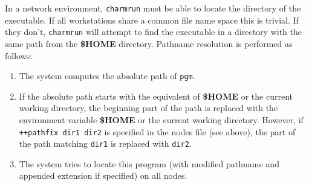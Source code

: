 In a network environment, {\tt charmrun} must
be able to locate the directory of the executable.  If all workstations
share a common file name space this is trivial.  If they don't, {\tt charmrun}
will attempt to find the executable in a directory with the same path
from the {\bf \$HOME} directory.  Pathname resolution is performed as 
follows:
\begin{enumerate}
	\item The system computes the absolute path of {\tt pgm}.
	\item If the absolute path starts with the equivalent of {\bf \$HOME} 
	or the current working directory, the beginning part of the 
        path 
	is replaced with the environment variable {\bf \$HOME} or the 
	current working directory. However, if {\tt ++pathfix dir1 dir2} is 
        specified in the nodes file (see above), the part of
        the path matching {\tt dir1} is replaced with {\tt dir2}.
	\item The system tries to locate this program (with modified 
	pathname and appended extension if specified) on all nodes.
\end{enumerate}

